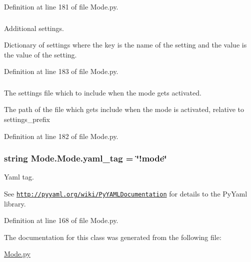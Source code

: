 Definition at line 181 of file Mode.py.

\hypertarget{class_mode_1_1_mode_af4bebfeddda24f7437fc086bc52ca711}{
\subsubsection[{settings}]{}}
\label{class_mode_1_1_mode_af4bebfeddda24f7437fc086bc52ca711}


Additional settings. 

Dictionary of settings where the key is the name of the setting and the value is the value of the setting. 

Definition at line 183 of file Mode.py.

\hypertarget{class_mode_1_1_mode_a40402dcfd634686dcd9b2ce8b8f3d4eb}{
\subsubsection[{settings\_\-file}]{}}
\label{class_mode_1_1_mode_a40402dcfd634686dcd9b2ce8b8f3d4eb}


The settings file which to include when the mode gets activated. 

The path of the file which gets include when the mode is activated, relative to settings\_\-prefix 

Definition at line 182 of file Mode.py.

\hypertarget{class_mode_1_1_mode_ae57cf492ec773e7116974023cfec575b}{
\subsubsection[{yaml\_\-tag}]{\setlength{\rightskip}{0pt plus 5cm}string {\bf Mode.Mode.yaml\_\-tag} = \char`\"{}!mode\char`\"{}}}
\label{class_mode_1_1_mode_ae57cf492ec773e7116974023cfec575b}


Yaml tag. 

See \href{http://pyyaml.org/wiki/PyYAMLDocumentation}{\tt http://pyyaml.org/wiki/PyYAMLDocumentation} for details to the PyYaml library. 

Definition at line 168 of file Mode.py.



The documentation for this class was generated from the following file:\begin{DoxyCompactItemize}
\item 
\hyperlink{_mode_8py}{Mode.py}\end{DoxyCompactItemize}
